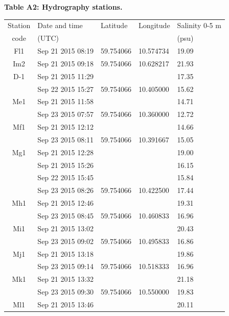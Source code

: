 \documentclass[12pt,a4paper,english]{article}
\begin{document}
\begin{table}[tb]
{\bf Table A2: Hydrography stations.}\\
\label{tab:CTD}
\begin{tabular}{|@{}c|l|l|l|l|} \hline
Station & Date and time & Latitude & Longitude & Salinity 0-5 m \\ 
code    &  (UTC)        &          &           & (psu) \\ \hline
Fl1 & Sep 21 2015 08:19 & 59.754066 & 10.574734 & 19.09\\ \hline
Im2 & Sep 21 2015 09:18 & 59.754066 & 10.628217 & 21.93\\ \hline
D-1 & Sep 21 2015 11:29 &           &           & 17.35\\ 
    & Sep 22 2015 15:27 & 59.754066 & 10.405000 & 15.62\\ \hline
Me1 & Sep 21 2015 11:58 &           &           & 14.71\\  
    & Sep 23 2015 07:57 & 59.754066 & 10.360000 & 12.72\\ \hline
Mf1 & Sep 21 2015 12:12 &           &           & 14.66\\ 
    & Sep 23 2015 08:11 & 59.754066 & 10.391667 & 15.05\\ \hline
Mg1 & Sep 21 2015 12:28 &           &           & 19.00\\
    & Sep 21 2015 15:26 &           &           & 16.15\\
    & Sep 22 2015 15:45 &           &           & 15.84\\	
    & Sep 23 2015 08:26 & 59.754066 & 10.422500 & 17.44\\ \hline
Mh1 & Sep 21 2015 12:46 &           &           & 19.31\\ 
    & Sep 23 2015 08:45 & 59.754066 & 10.460833 & 16.96\\ \hline
Mi1 & Sep 21 2015 13:02 &           &           & 20.43\\ 
    & Sep 23 2015 09:02 & 59.754066 & 10.495833 & 16.86\\ \hline
Mj1 & Sep 21 2015 13:18 &           &           & 19.86\\ 
    & Sep 23 2015 09:14 & 59.754066 & 10.518333 & 16.96\\ \hline
Mk1 & Sep 21 2015 13:32 &           &           & 21.18\\ 
    & Sep 23 2015 09:30 & 59.754066 & 10.550000 & 19.83\\ \hline
Ml1 & Sep 21 2015 13:46 &           &           & 20.11\\ 

\end{tabular}
\end{table}
\end{document}
